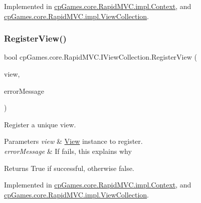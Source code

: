 Implemented in \mbox{\hyperlink{classcp_games_1_1core_1_1_rapid_m_v_c_1_1impl_1_1_context_aa35849819d74cafb71b0056f370872e2}{cp\+Games.\+core.\+Rapid\+M\+V\+C.\+impl.\+Context}}, and \mbox{\hyperlink{classcp_games_1_1core_1_1_rapid_m_v_c_1_1impl_1_1_view_collection_a958ac198eae02d710e3abe17aed90205}{cp\+Games.\+core.\+Rapid\+M\+V\+C.\+impl.\+View\+Collection}}.

\mbox{\label{interfacecp_games_1_1core_1_1_rapid_m_v_c_1_1_i_view_collection_aba8465ad92ed63a4ad210c60d50cfc56}} 
\subsubsection{\texorpdfstring{RegisterView()}{RegisterView()}}
{\footnotesize\ttfamily bool cp\+Games.\+core.\+Rapid\+M\+V\+C.\+I\+View\+Collection.\+Register\+View (\begin{DoxyParamCaption}\item[{\mbox{\hyperlink{interfacecp_games_1_1core_1_1_rapid_m_v_c_1_1_i_view}{I\+View}}}]{view,  }\item[{out string}]{error\+Message }\end{DoxyParamCaption})}



Register a unique view. 


\begin{DoxyParams}{Parameters}
{\em view} & \mbox{\hyperlink{classcp_games_1_1core_1_1_rapid_m_v_c_1_1_view}{View}} instance to register.\\
\hline
{\em error\+Message} & If fails, this explains why\\
\hline
\end{DoxyParams}
\begin{DoxyReturn}{Returns}
True if successful, otherwise false.
\end{DoxyReturn}


Implemented in \mbox{\hyperlink{classcp_games_1_1core_1_1_rapid_m_v_c_1_1impl_1_1_context_aaca630e99979716757f6b028b8b4aa0c}{cp\+Games.\+core.\+Rapid\+M\+V\+C.\+impl.\+Context}}, and \mbox{\hyperlink{classcp_games_1_1core_1_1_rapid_m_v_c_1_1impl_1_1_view_collection_a654222e061d5dc730992cbc0aa519205}{cp\+Games.\+core.\+Rapid\+M\+V\+C.\+impl.\+View\+Collection}}.

